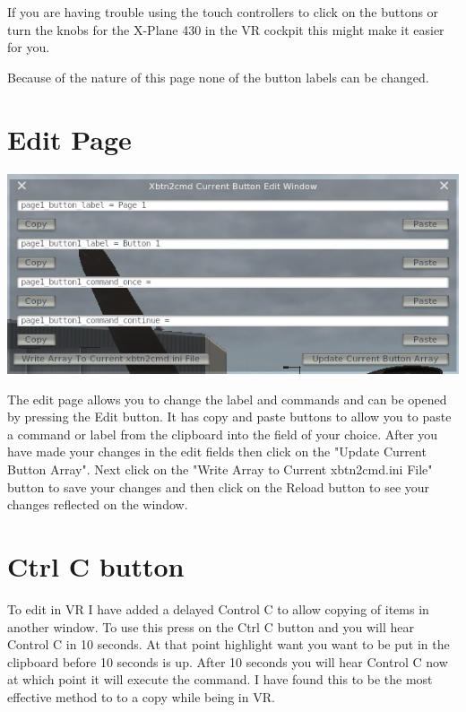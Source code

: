 \documentclass[11pt,parskip=half,a4paper]{scrartcl}
\begin{document}
If you are having trouble using the touch controllers to click on the buttons or turn the knobs for the X-Plane 430 in the VR cockpit this might make it easier for you. \newline

Because of the nature of this page none of the button labels can be changed.

\newpage
\section{Edit Page}

\begin{center}
\includegraphics[width=15cm]{Xbtn2cmd_Edit_Page.png}
\end{center}

The edit page allows you to change the label and commands and can be opened by pressing the Edit button. It has copy and paste buttons to allow you to paste a command or label from the clipboard into the field of your choice. After you have made your changes in the edit fields then click on the "Update Current Button Array". Next click on the "Write Array to Current xbtn2cmd.ini File" button to save your changes and then click on the Reload button to see your changes reflected on the window. 

\section{Ctrl C button}

To edit in VR I have added a delayed Control C to allow copying of items in another window. To use this press on the Ctrl C button and you will hear Control C in 10 seconds. At that point highlight want you want to be put in the clipboard before 10 seconds is up. After 10 seconds you will hear Control C now at which point it will execute the command. I have found this to be the most effective method to to a copy while being in VR.
\end{document}
